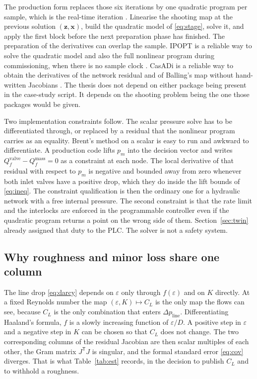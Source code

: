 The production form replaces those six iterations by one quadratic program per sample, which is the real-time iteration \citep{diehl2005,gros2020}. Linearise the shooting map at the previous solution $(\mathbf{z},\mathbf{x})$, build the quadratic model of \eqref{eq:stage}, solve it, and apply the first block before the next preparation phase has finished. The preparation of the derivatives can overlap the sample. IPOPT is a reliable way to solve the quadratic model and also the full nonlinear program during commissioning, when there is no sample clock \citep{wachter2006}. CasADi is a reliable way to obtain the derivatives of the network residual and of Balling's map without hand-written Jacobians \citep{andersson2019}. The thesis does not depend on either package being present in the case-study script. It depends on the shooting problem being the one those packages would be given.

Two implementation constraints follow. The scalar pressure solve has to be differentiated through, or replaced by a residual that the nonlinear program carries as an equality. Brent's method on a scalar is easy to run and awkward to differentiate. A production code lifts $p_m$ into the decision vector and writes $Q_f^{\mathrm{valve}}-Q_f^{\mathrm{mass}}=0$ as a constraint at each node. The local derivative of that residual with respect to $p_m$ is negative and bounded away from zero whenever both inlet valves have a positive drop, which they do inside the lift bounds of \eqref{eq:ineq}. The constraint qualification is then the ordinary one for a hydraulic network with a free internal pressure. The second constraint is that the rate limit and the interlocks are enforced in the programmable controller even if the quadratic program returns a point on the wrong side of them. Section~\ref{sec:twin} already assigned that duty to the PLC. The solver is not a safety system.

\subsection{Why roughness and minor loss share one column}
\label{sec:confound}

The line drop \eqref{eq:darcy} depends on $\varepsilon$ only through $f(\varepsilon)$ and on $K$ directly. At a fixed Reynolds number the map $(\varepsilon,K)\mapsto C_L$ is the only map the flows can see, because $C_L$ is the only combination that enters $\Delta p_{\mathrm{line}}$. Differentiating Haaland's formula, $f$ is a slowly increasing function of $\varepsilon/D$. A positive step in $\varepsilon$ and a negative step in $K$ can be chosen so that $C_L$ does not change. The two corresponding columns of the residual Jacobian are then scalar multiples of each other, the Gram matrix $J^{\mathsf T}J$ is singular, and the formal standard error \eqref{eq:cov} diverges. That is what Table~\ref{tab:est} records, in the decision to publish $C_L$ and to withhold a roughness.

